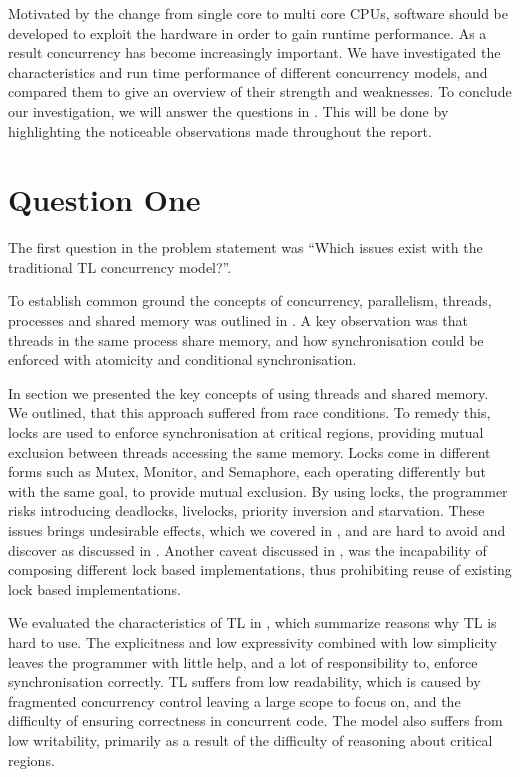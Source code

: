 \makeatletter {}\makeatother
{}
%
Motivated by the change from single core to multi core \acp{CPU}, software should be developed to exploit the hardware in order to gain runtime performance. As a result concurrency has become increasingly important. We have investigated the characteristics and run time performance of different concurrency models, and compared them to give an overview of their strength and weaknesses. To conclude our investigation, we will answer the questions in . This will be done by highlighting the noticeable observations made throughout the report.
\label{chap:conclusion}
\section{Question One}
The first question in the problem statement was ``Which issues exist with the traditional \ac{TL} concurrency model?''. 

To establish common ground the concepts of concurrency, parallelism, threads, processes and shared memory was outlined in . A key observation was that threads in the same process share memory, and how synchronisation could be enforced with atomicity and conditional synchronisation.

In section  we presented the key concepts of using threads and shared memory. We outlined, that this approach suffered from race conditions. To remedy this, locks are used to enforce synchronisation at critical regions, providing mutual exclusion between threads accessing the same memory. Locks come in different forms such as Mutex, Monitor, and Semaphore, each operating differently but with the same goal, to provide mutual exclusion. By using locks, the programmer risks introducing deadlocks, livelocks, priority inversion and starvation. These issues brings undesirable effects, which we covered in , and are hard to avoid and discover as discussed in . Another caveat discussed in , was the incapability of composing different lock based implementations, thus prohibiting reuse of existing lock based implementations. 

We evaluated the characteristics of \ac{TL} in , which summarize reasons why \ac{TL} is hard to use. The explicitness and low expressivity combined with low simplicity leaves the programmer with little help, and a lot of responsibility to, enforce synchronisation correctly. \ac{TL} suffers from low readability, which is caused by fragmented concurrency control leaving a large scope to focus on, and the difficulty of ensuring correctness in concurrent code. The model also suffers from low writability, primarily as a result of the difficulty of reasoning about critical regions.


